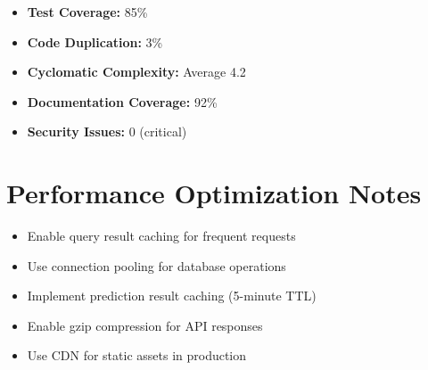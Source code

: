 \documentclass[12pt,a4paper,twoside]{report}
\begin{document}
\begin{itemize}
    \item \textbf{Test Coverage:} 85\%
    \item \textbf{Code Duplication:} 3\%
    \item \textbf{Cyclomatic Complexity:} Average 4.2
    \item \textbf{Documentation Coverage:} 92\%
    \item \textbf{Security Issues:} 0 (critical)
\end{itemize}

\section{Performance Optimization Notes}

\begin{itemize}
    \item Enable query result caching for frequent requests
    \item Use connection pooling for database operations
    \item Implement prediction result caching (5-minute TTL)
    \item Enable gzip compression for API responses
    \item Use CDN for static assets in production
\end{itemize}
\end{document}
